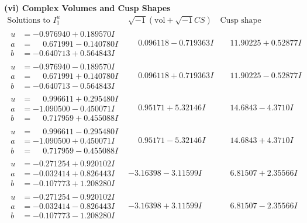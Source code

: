 \documentclass[1p]{elsarticle_modified}
\theoremstyle{definition}
\newcommand{\I}{\sqrt{-1}}
\begin{document}
\newpage\flushleft \textbf{(vi) Complex Volumes and Cusp Shapes}
$$\begin{array}{c|c|c}  
\text{Solutions to }I^u_{1}& \I (\text{vol} + \sqrt{-1}CS) & \text{Cusp shape}\\
 \hline 
\begin{aligned}
u &= -0.976940 + 0.189570 I \\
a &= \phantom{-}0.671991 - 0.140780 I \\
b &= -0.640713 + 0.564843 I\end{aligned}
 & \phantom{-}0.096118 - 0.719363 I & \phantom{-}11.90225 + 0.52877 I \\ \hline\begin{aligned}
u &= -0.976940 - 0.189570 I \\
a &= \phantom{-}0.671991 + 0.140780 I \\
b &= -0.640713 - 0.564843 I\end{aligned}
 & \phantom{-}0.096118 + 0.719363 I & \phantom{-}11.90225 - 0.52877 I \\ \hline\begin{aligned}
u &= \phantom{-}0.996611 + 0.295480 I \\
a &= -1.090500 - 0.450071 I \\
b &= \phantom{-}0.717959 + 0.455088 I\end{aligned}
 & \phantom{-}0.95171 + 5.32146 I & \phantom{-}14.6843 - 4.3710 I \\ \hline\begin{aligned}
u &= \phantom{-}0.996611 - 0.295480 I \\
a &= -1.090500 + 0.450071 I \\
b &= \phantom{-}0.717959 - 0.455088 I\end{aligned}
 & \phantom{-}0.95171 - 5.32146 I & \phantom{-}14.6843 + 4.3710 I \\ \hline\begin{aligned}
u &= -0.271254 + 0.920102 I \\
a &= -0.032414 + 0.826443 I \\
b &= -0.107773 + 1.208280 I\end{aligned}
 & -3.16398 - 3.11599 I & \phantom{-}6.81507 + 2.35566 I \\ \hline\begin{aligned}
u &= -0.271254 - 0.920102 I \\
a &= -0.032414 - 0.826443 I \\
b &= -0.107773 - 1.208280 I\end{aligned}
 & -3.16398 + 3.11599 I & \phantom{-}6.81507 - 2.35566 I \\ \hline\begin{aligned}

\end{aligned}
\end{array}$$
\end{document}
